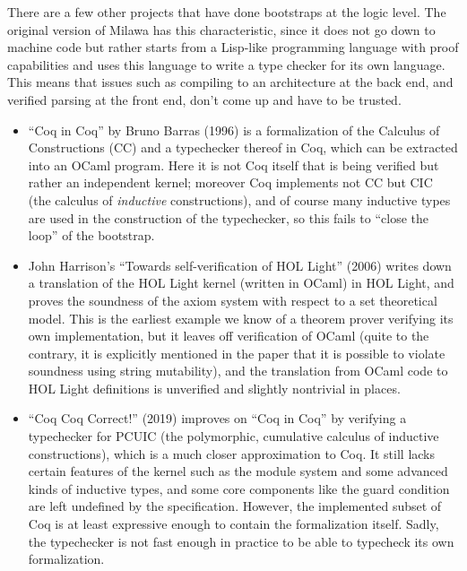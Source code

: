 \documentclass[runningheads]{llncs}
\begin{document}
There are a few other projects that have done bootstraps at the logic level. The original version of Milawa has this characteristic, since it does not go down to machine code but rather starts from a Lisp-like programming language with proof capabilities and uses this language to write a type checker for its own language. This means that issues such as compiling to an architecture at the back end, and verified parsing at the front end, don't come up and have to be trusted.
\begin{itemize}
  \item ``Coq in Coq'' by Bruno Barras (1996) \cite{barras1996coq} is a formalization of the Calculus of Constructions (CC) and a typechecker thereof in Coq, which can be extracted into an OCaml program. Here it is not Coq itself that is being verified but rather an independent kernel; moreover Coq implements not CC but CIC (the calculus of \emph{inductive} constructions), and of course many inductive types are used in the construction of the typechecker, so this fails to ``close the loop'' of the bootstrap.

  \item John Harrison's ``Towards self-verification of HOL Light'' (2006) \cite{harrison-holhol} writes down a translation of the HOL Light kernel (written in OCaml) in HOL Light, and proves the soundness of the axiom system with respect to a set theoretical model. This is the earliest example we know of a theorem prover verifying its own implementation, but it leaves off verification of OCaml (quite to the contrary, it is explicitly mentioned in the paper that it is possible to violate soundness using string mutability), and the translation from OCaml code to HOL Light definitions is unverified and slightly nontrivial in places.

  \item ``Coq Coq Correct!'' (2019) \cite{sozeaucoq} improves on ``Coq in Coq'' by verifying a typechecker for PCUIC (the polymorphic, cumulative calculus of inductive constructions), which is a much closer approximation to Coq. It still lacks certain features of the kernel such as the module system and some advanced kinds of inductive types, and some core components like the guard condition are left undefined by the specification. However, the implemented subset of Coq is at least expressive enough to contain the formalization itself. Sadly, the typechecker is not fast enough in practice to be able to typecheck its own formalization.
\end{itemize}
\end{document}
